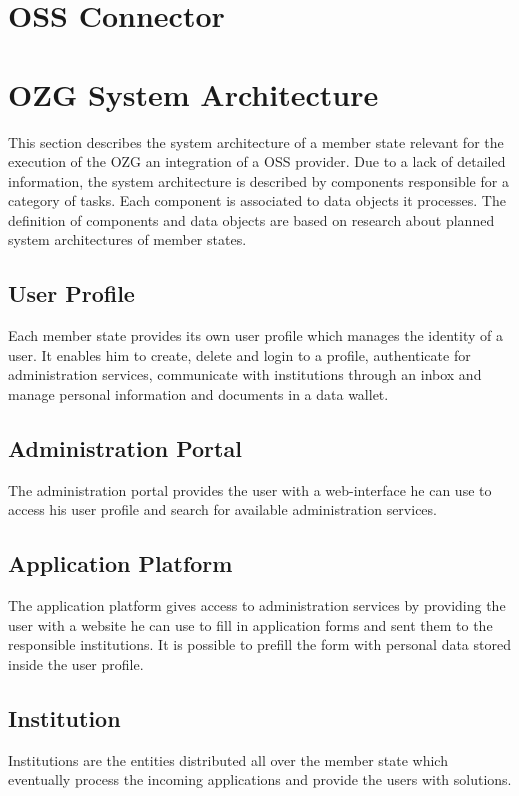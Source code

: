 \documentclass[
     12pt,         %
     a4paper,      %
     BCOR=10mm,version=first,     %
     DIV=14,version=first,        %
     ]{scrreprt}
\begin{document}
\section{OSS Connector}

\section{OZG System Architecture}
This section describes the system architecture of a member state relevant for the execution of the OZG an integration of a OSS provider. Due to a lack of detailed information, the system architecture is described by components responsible for a category of tasks. Each component is associated to data objects it processes. The definition of components and data objects are based on research about planned system architectures of member states.

\subsection{User Profile}
Each member state provides its own user profile which manages the identity of a user. It enables him to create, delete and login to a profile, authenticate for administration services, communicate with institutions through an inbox and manage personal information and documents in a data wallet.

\subsection{Administration Portal}
The administration portal provides the user with a web-interface he can use to access his user profile and search for available administration services.

\subsection{Application Platform}
The application platform gives access to administration services by providing the user with a website he can use to fill in application forms and sent them to the responsible institutions. It is possible to prefill the form with personal data stored inside the user profile.

\subsection{Institution}
Institutions are the entities distributed all over the member state which eventually process the incoming applications and provide the users with solutions.
\end{document}
